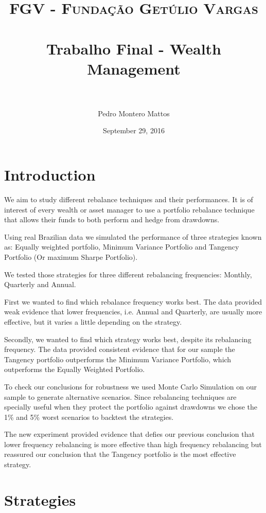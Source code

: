 \documentclass[paper=a4, fontsize=11pt]{scrartcl} %
\title{	
\normalfont \normalsize 
\textsc{FGV - Fundação Getúlio Vargas} \\ [25pt] %
\horrule{0.5pt} \\[0.4cm] %
\huge Trabalho Final - Wealth Management \\ %
\horrule{2pt} \\[0.5cm] %
}
\author{Pedro Montero Mattos} %
\date{\normalsize September 29, 2016} %
\numberwithin{equation}{section} %
\numberwithin{figure}{section} %
\numberwithin{table}{section} %
\begin{document}
\maketitle %


\section{Introduction}

We aim to study different rebalance techniques and their performances. It is of interest of every wealth or asset manager to use a portfolio rebalance technique that allows their funds to both perform and hedge from drawdowns.

Using real Brazilian data we simulated the performance of three strategies known as: Equally weighted portfolio, Minimum Variance Portfolio and Tangency Portfolio (Or maximum Sharpe Portfolio).

We tested those strategies for three different rebalancing frequencies: Monthly, Quarterly and Annual.

First we wanted to find which rebalance frequency works best. The data provided weak evidence that lower frequencies, i.e. Annual and Quarterly, are usually more effective, but it varies a little depending on the strategy.

Secondly, we wanted to find which strategy works best, despite its rebalancing frequency. The data provided consistent evidence that for our sample the Tangency portfolio outperforms the Minimum Variance Portfolio, which outperforms the Equally Weighted Portfolio.

To check our conclusions for robustness we used Monte Carlo Simulation on our sample to generate alternative scenarios. Since rebalancing techniques are specially useful when they protect the portfolio against drawdowns we chose the 1\% and 5\% worst scenarios to backtest the strategies.

The new experiment provided evidence that defies our previous conclusion that lower frequency rebalancing is more effective than high frequency rebalancing but reassured our conclusion that the Tangency portfolio is the most effective strategy.


\section{Strategies}
\end{document}
